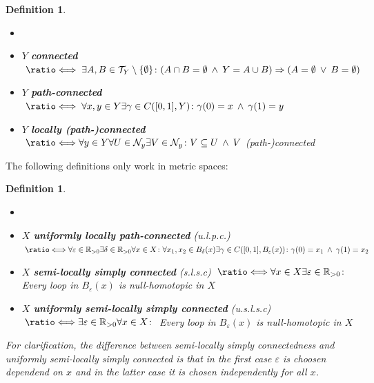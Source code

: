 \documentclass[a4paper, 11pt, twoside]{article}
\newcommand{\R}[0]{\mathbb{R}}
\newcommand{\T}[0]{\mathcal{T}}
\newcommand{\NB}[0]{\mathcal{N}}
\newcommand*{\longeq}{\ratio\Longleftrightarrow}
\theoremstyle{break}
\theoremstyle{break}
\newtheorem{defin}[thm]{Definition}
\begin{document}
\begin{defin} \label{def:connectedness}
  \begin{itemize}
    \item[] %
    \item $Y$ \textbf{connected} $\;\longeq\; \exists A,B \in \T_Y\setminus \{\emptyset\}\colon (A \cap B = \emptyset \: \land \: Y = A \cup B) \Rightarrow (A = \emptyset \: \lor \: B = \emptyset)$
    \item $Y$ \textbf{path-connected} $\;\longeq\; \forall x,y \in Y \exists\gamma \in C([0,1], Y)\colon \gamma(0) = x \: \land \: \gamma(1) = y$
    \item $Y$ \textbf{locally (path-)connected} $\;\longeq \\ \forall y \in Y\forall U \in \NB_y\exists V\in \NB_y\colon V \subseteq U \: \land \: V$ (path-)connected
  \end{itemize}
\end{defin}

The following definitions only work in metric spaces:

\begin{defin}
  \begin{itemize}
    \item[] %
    \item $X$ \textbf{uniformly locally path-connected} (u.l.p.c.) $\: \longeq \\ \forall \varepsilon \in \R_{>0} \exists \delta \in \R_{>0}\forall x \in X\colon \forall x_1, x_2 \in B_{\delta}(x)\exists \gamma \in C([0,1], B_{\varepsilon}(x))\colon \gamma(0) = x_1 \: \land \: \gamma(1) = x_2$
    \item $X$ \textbf{semi-locally simply connected} (s.l.s.c) $\: \longeq \\ \forall x\in X\exists \varepsilon \in \R_{>0}\colon$ Every loop in $B_{\varepsilon}(x)$ is null-homotopic in $X$
    \item $X$ \textbf{uniformly semi-locally simply connected} (u.s.l.s.c) $\: \longeq \\ \exists \varepsilon \in \R_{>0}\forall x\in X\colon$ Every loop in $B_{\varepsilon}(x)$ is null-homotopic in $X$
  \end{itemize}
  \vspace*{10pt}
  For clarification, the difference between semi-locally simply connectedness and uniformly semi-locally simply connected is 
  that in the first case $\varepsilon$ is choosen dependend on $x$ and in the latter case it is chosen independently for all $x$.
\end{defin}
\end{document}
